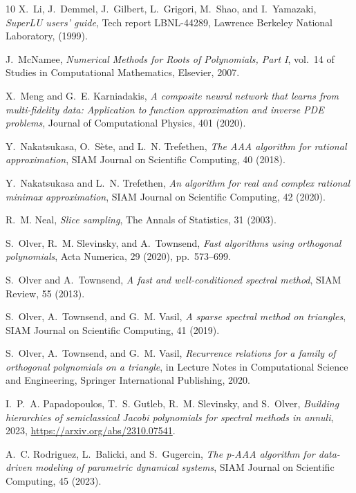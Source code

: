 \documentclass{article}
\begin{document}
\begin{thebibliography}{10}
{\sc X.~Li, J.~Demmel, J.~Gilbert, L.~Grigori, M.~Shao, and I.~Yamazaki}, {\em {SuperLU} users' guide}, Tech report LBNL-44289, Lawrence Berkeley National Laboratory,  (1999).

{\sc J.~McNamee}, {\em Numerical Methods for Roots of Polynomials, Part I}, vol.~14 of Studies in Computational Mathematics, Elsevier, 2007.

{\sc X.~Meng and G.~E. Karniadakis}, {\em A composite neural network that learns from multi-fidelity data: Application to function approximation and inverse {PDE} problems}, Journal of Computational Physics, 401 (2020).

{\sc Y.~Nakatsukasa, O.~S{\`{e}}te, and L.~N. Trefethen}, {\em The {AAA} algorithm for rational approximation}, {SIAM} Journal on Scientific Computing, 40 (2018).

{\sc Y.~Nakatsukasa and L.~N. Trefethen}, {\em An algorithm for real and complex rational minimax approximation}, {SIAM} Journal on Scientific Computing, 42 (2020).

{\sc R.~M. Neal}, {\em Slice sampling}, The Annals of Statistics, 31 (2003).

{\sc S.~Olver, R.~M. Slevinsky, and A.~Townsend}, {\em Fast algorithms using orthogonal polynomials}, Acta Numerica, 29 (2020), pp.~573--699.

{\sc S.~Olver and A.~Townsend}, {\em A fast and well-conditioned spectral method}, {SIAM} Review, 55 (2013).

{\sc S.~Olver, A.~Townsend, and G.~M. Vasil}, {\em A sparse spectral method on triangles}, {SIAM} Journal on Scientific Computing, 41 (2019).

{\sc S.~Olver, A.~Townsend, and G.~M. Vasil}, {\em Recurrence relations for a family of orthogonal polynomials on a triangle}, in Lecture Notes in Computational Science and Engineering, Springer International Publishing, 2020.

{\sc I.~P.~A. Papadopoulos, T.~S. Gutleb, R.~M. Slevinsky, and S.~Olver}, {\em Building hierarchies of semiclassical {J}acobi polynomials for spectral methods in annuli}, 2023, \url{https://arxiv.org/abs/2310.07541}.

{\sc A.~C. Rodriguez, L.~Balicki, and S.~Gugercin}, {\em The p-{AAA} algorithm for data-driven modeling of parametric dynamical systems}, SIAM Journal on Scientific Computing, 45 (2023).


\end{thebibliography}
\end{document}

